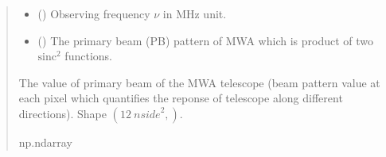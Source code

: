 \documentclass[a4paper,11pt,oneside,english,openany]{sphinxmanual}
\begin{document}
\begin{fulllineitems}
\begin{quote}
\begin{description}
\begin{itemize}
\item {} 
\sphinxAtStartPar
{} () \textendash{} Observing frequency \(\nu\) in \(\mathrm{MHz}\) unit.

\item {} 
\sphinxAtStartPar
{} () \textendash{} The primary beam (PB) pattern of MWA which is product of two \(\text{sinc}^2\) functions.

\end{itemize}

\sphinxAtStartPar
{} \textendash{} The value of primary beam of the MWA telescope (beam pattern value at each pixel which quantifies the reponse of telescope along different directions). Shape \((12\ {nside}^2, )\).

\sphinxAtStartPar
np.ndarray

\end{description}\end{quote}

\end{fulllineitems}

\end{document}
